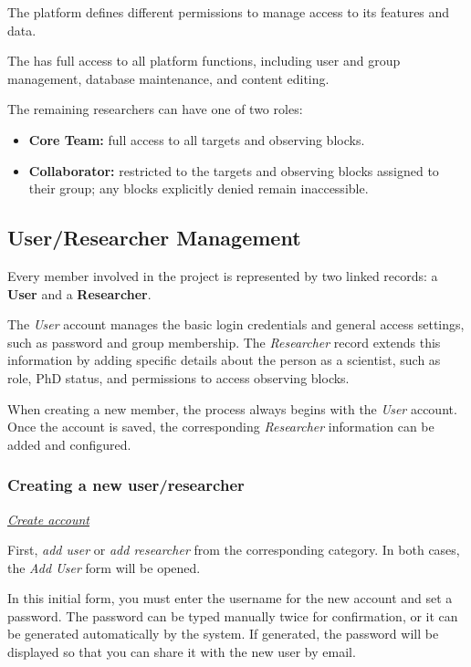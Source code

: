 The platform defines different permissions to manage access to its features and data. 

The \admin has full access to all platform functions, including user and group management, database maintenance, and content editing.

The remaining researchers can have one of two roles:

\begin{itemize}
	\item \textbf{Core Team:} full access to all targets and observing blocks.
	\item \textbf{Collaborator:} restricted to the targets and observing blocks assigned to their group; any blocks explicitly denied remain inaccessible.
\end{itemize}


\subsection{User/Researcher Management}

Every member involved in the project is represented by two linked records: a \textbf{User} and a \textbf{Researcher}.

The \textsl{User} account manages the basic login credentials and general access settings, such as password and group membership. The \textsl{Researcher} record extends this information by adding specific details about the person as a scientist, such as role, PhD status, and permissions to access observing blocks.

When creating a new member, the process always begins with the \textsl{User} account. Once the account is saved, the corresponding \textsl{Researcher} information can be added and configured.


\subsubsection{Creating a new user/researcher}


\underline{\textsl{Create account}}

First, \textsl{add user} or \textsl{add researcher} from the corresponding category. In both cases, the \textsl{Add User} form will be opened. 

In this initial form, you must enter the username for the new account and set a password. The password can be typed manually twice for confirmation, or it can be generated automatically by the system. If generated, the password will be displayed so that you can share it with the new user by email.

